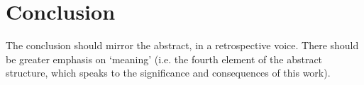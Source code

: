 \section{Conclusion}

The conclusion should mirror the abstract, in a retrospective voice.
There should be greater emphasis on `meaning' (i.e. the fourth element
of the abstract structure, which speaks to the significance and
consequences of this work).

